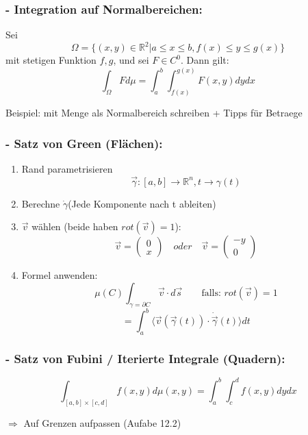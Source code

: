 \documentclass[6pt]{article}
\begin{document}
\begin{multicols*}{3}
		\subsubsection*{- Integration auf Normalbereichen:}
		Sei
		\[
				\Omega = \{	(x,y) \in \mathbb{R}^2 | a \leq x \leq b, f(x) \leq y \leq g(x)	\}
		\]
		mit stetigen Funktion $f,g$, und sei $F \in C^0$. Dann gilt:
		\[
				\int_{\Omega} F d\mu = \int_{a}^{b} \int_{f(x)}^{g(x)} F(x,y) dy dx
		\]
		
		Beispiel: mit Menge als Normalbereich schreiben + Tipps für Betraege
		
		
		\subsubsection*{- Satz von Green (Fl{\"a}chen):}
		
		\begin{enumerate}
				\item 	Rand parametrisieren
							\[
								\vec{\gamma} : [a,b] \rightarrow \mathbb{R}^n, t \rightarrow \gamma(t)
							\]
				\item 	Berechne $\dot{\gamma}$(Jede Komponente nach t ableiten)
				\item 	$\vec{v}$ w{\"a}hlen (beide haben $rot(\vec{v})=1$):
							\[
										\vec{v} = \begin{pmatrix}0\\x\end{pmatrix}	\quad oder \quad \vec{v} = \begin{pmatrix}-y \\0\end{pmatrix}	
							\]
				\item 	Formel anwenden:
							\[
							   \mu(C) \int_{\gamma = \partial C} \vec{v} \cdot d\vec{s}  \qquad \text{falls: } rot(\vec{v})=1
							\]
							\[
								= \int_{a}^{b} \langle\vec{v}(\vec{\gamma}(t)) \cdot \dot{\vec{\gamma}}(t)\rangle dt 
							\]
		\end{enumerate}

		
		\subsubsection*{- Satz von Fubini / Iterierte Integrale (Quadern):}		
		\[
				\int_{[a,b]\times[c,d]} f(x,y) d\mu(x,y) = \int_{a}^{b} \int_{c}^{d} f(x,y) dy  dx
		\]
		
		$\Rightarrow $ Auf Grenzen aufpassen (Aufabe 12.2)
		

\end{multicols*}
\end{document}
